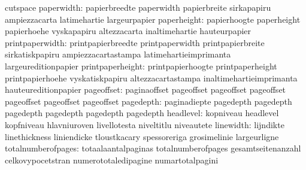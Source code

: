                                   cutspace
                      paperwidth: papierbreedte                    paperwidth
                                  papierbreite                     sirkapapiru
                                  ampiezzacarta                    latimehartie
                                  largeurpapier
                     paperheight: papierhoogte                     paperheight
                                  papierhoehe                      vyskapapiru
                                  altezzacarta                     inaltimehartie
                                  hauteurpapier
                 printpaperwidth: printpapierbreedte               printpaperwidth
                                  printpapierbreite                sirkatiskpapiru
                                  ampiezzacartastampa              latimehartieimprimanta
                                  largeureditionpapier
                printpaperheight: printpapierhoogte                printpaperheight
                                  printpapierhoehe                 vyskatiskpapiru
                                  altezzacartastampa               inaltimehartieimprimanta
                                  hauteureditionpapier
                      pageoffset: paginaoffset                     pageoffset
                                  pageoffset                       pageoffset
                                  pageoffset                       pageoffset
                                  pageoffset
                       pagedepth: paginadiepte                     pagedepth
                                  pagedepth                        pagedepth
                                  pagedepth                        pagedepth
                                  pagedepth
                       headlevel: kopniveau                        headlevel
                                  kopfniveau                       hlavniuroven
                                  livellotesta                     niveltitlu
                                  niveautete
                       linewidth: lijndikte                        linethickness
                                  liniendicke                      tloustkacary
                                  spessoreriga                     grosimelinie
                                  largeurligne
              totalnumberofpages: totaalaantalpaginas              totalnumberofpages
                                  gesamtseitenanzahl               celkovypocetstran
                                  numerototaledipagine             numartotalpagini
